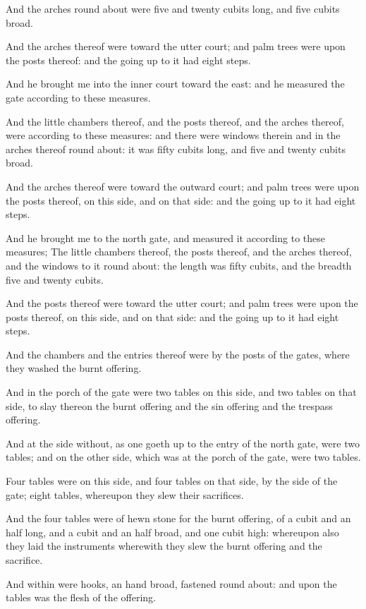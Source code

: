 \Verse And the arches round about were five and twenty cubits long, and five cubits broad.

\Verse And the arches thereof were toward the utter court; and palm trees were upon the posts thereof: and the going up to it had eight steps.

\Verse And he brought me into the inner court toward the east: and he measured the gate according to these measures.

\Verse And the little chambers thereof, and the posts thereof, and the arches thereof, were according to these measures: and there were windows therein and in the arches thereof round about: it was fifty cubits long, and five and twenty cubits broad.

\Verse And the arches thereof were toward the outward court; and palm trees were upon the posts thereof, on this side, and on that side: and the going up to it had eight steps.

\Verse And he brought me to the north gate, and measured it according to these measures; \Verse The little chambers thereof, the posts thereof, and the arches thereof, and the windows to it round about: the length was fifty cubits, and the breadth five and twenty cubits.

\Verse And the posts thereof were toward the utter court; and palm trees were upon the posts thereof, on this side, and on that side: and the going up to it had eight steps.

\Verse And the chambers and the entries thereof were by the posts of the gates, where they washed the burnt offering.

\Verse And in the porch of the gate were two tables on this side, and two tables on that side, to slay thereon the burnt offering and the sin offering and the trespass offering.

\Verse And at the side without, as one goeth up to the entry of the north gate, were two tables; and on the other side, which was at the porch of the gate, were two tables.

\Verse Four tables were on this side, and four tables on that side, by the side of the gate; eight tables, whereupon they slew their sacrifices.

\Verse And the four tables were of hewn stone for the burnt offering, of a cubit and an half long, and a cubit and an half broad, and one cubit high: whereupon also they laid the instruments wherewith they slew the burnt offering and the sacrifice.

\Verse And within were hooks, an hand broad, fastened round about: and upon the tables was the flesh of the offering.

